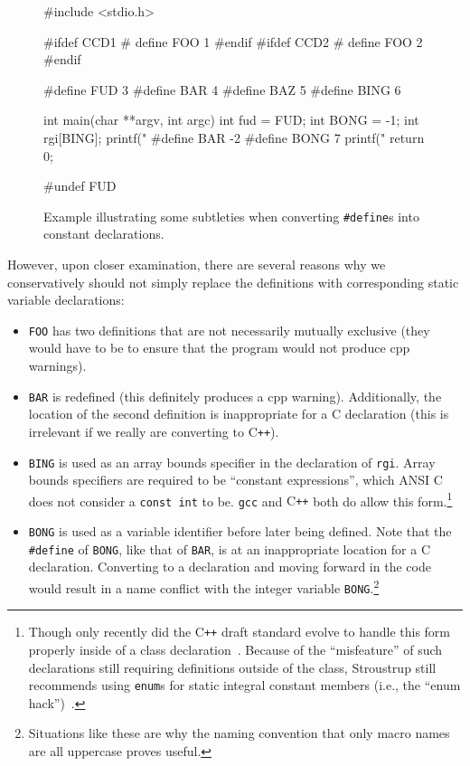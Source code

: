 \documentclass{article}
\newcommand{\Cpp}{\mbox{\textsf{cpp}}}
\newcommand{\CPP}{\mbox{\textsf{C\texttt{++}}}}
\newcommand{\C}{\mbox{\textsf{C}}}
\newcommand{\ppd}[1]{\texttt{\##1}}
\newcommand{\ie}{i.e.,}
\begin{document}
\begin{figure}[htbp]
\begin{center}
\begin{small}
\begin{pseudocode}[4.5in]
#include <stdio.h>

#ifdef CCD1
#  define FOO 1
#endif
#ifdef CCD2
#  define FOO 2
#endif

#define FUD 3
#define BAR 4
#define BAZ 5
#define BING 6

int main(char **argv, int argc) {
  int fud = FUD;
  int BONG = -1;
  int rgi[BING];
  printf("%
#define BAR -2
#define BONG 7
  printf("%
  return 0;
}

#undef FUD
\end{pseudocode}
\end{small}
\caption{Example illustrating some subtleties when converting \ppd{define}s
  into constant declarations.}
\label{fig:def_example}
\end{center}
\end{figure}

However, upon closer examination, there are several reasons why we
conservatively should not simply replace the definitions with
corresponding static variable declarations:

\begin{itemize}
\item \texttt{FOO} has two definitions that are not necessarily mutually
      exclusive (they would have to be to ensure that the program would
      not produce \Cpp{} warnings).
\item \texttt{BAR} is redefined (this definitely produces a \Cpp{}
      warning).  Additionally, the location of the second definition is
      inappropriate for a \C{} declaration (this is irrelevant if we
      really are converting to \CPP{}).
\item \texttt{BING} is used as an array bounds specifier in the
      declaration of \texttt{rgi}.  Array bounds specifiers are required
      to be ``constant expressions'', which ANSI \C{} does not consider
      a \texttt{const int} to be.  \texttt{gcc} and \CPP{} both do allow
      this form.\footnote{Though only recently did the \CPP{} draft standard
      evolve to handle this form properly inside of a class
      declaration~\cite{CD2DraftStandard}.  Because of the
      ``misfeature'' of such declarations still requiring definitions
      outside of the class, Stroustrup still recommends using
      \texttt{enum}s for static integral constant members (\ie{} the
      ``enum hack'')~\cite[p.~249]{Stroustrup97}.}
\item \texttt{BONG} is used as a variable identifier before later being
      defined.  Note that the \ppd{define} of \texttt{BONG}, like that
      of \texttt{BAR}, is at an inappropriate location for a \C{}
      declaration.  Converting to a declaration and moving forward in
      the code would result in a name conflict with the integer variable
      \texttt{BONG}.\footnote{Situations like these are why the naming
      convention that only macro names are all uppercase proves useful.}
\end{itemize}
\end{document}
